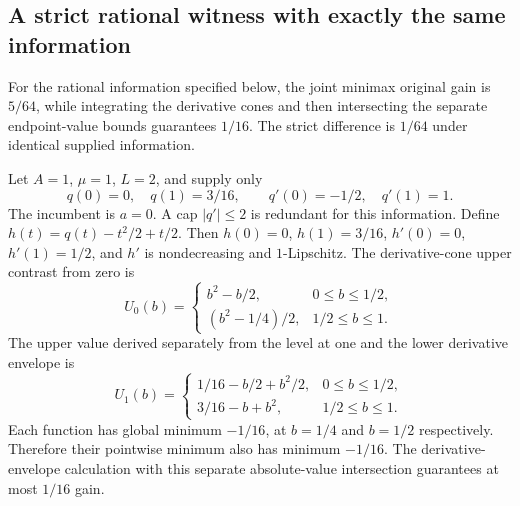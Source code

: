 \subsection{A strict rational witness with exactly the same information}
\label{supp:jointwitness124}

\begin{proposition}
\label{prop:jointwitness124}
For the rational information specified below, the joint minimax original
gain is $5/64$, while integrating the derivative cones and then
intersecting the separate endpoint-value bounds guarantees $1/16$.
The strict difference is $1/64$ under identical supplied information.
\end{proposition}

Let $A=1$, $\mu=1$, $L=2$, and supply only
\[
 q(0)=0,\quad q(1)=3/16,\qquad
 q'(0)=-1/2,\quad q'(1)=1.
\]
The incumbent is $a=0$. A cap $|q'|\le2$ is redundant for this
information. Define
$h(t)=q(t)-t^2/2+t/2$. Then $h(0)=0$, $h(1)=3/16$,
$h'(0)=0$, $h'(1)=1/2$, and $h'$ is nondecreasing and
$1$-Lipschitz. The derivative-cone upper contrast from zero is
\[
 U_0(b)=\begin{cases}
 b^2-b/2,&0\le b\le1/2,\\
 (b^2-1/4)/2,&1/2\le b\le1.
 \end{cases}
\]
The upper value derived separately from the level at one and the
lower derivative envelope is
\[
 U_1(b)=\begin{cases}
 1/16-b/2+b^2/2,&0\le b\le1/2,\\
 3/16-b+b^2,&1/2\le b\le1.
 \end{cases}
\]
Each function has global minimum $-1/16$, at $b=1/4$ and
$b=1/2$ respectively. Therefore their pointwise minimum also has
minimum $-1/16$. The derivative-envelope calculation with this
separate absolute-value intersection guarantees at most $1/16$ gain.

